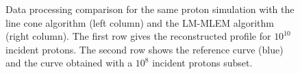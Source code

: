 \begin{figure}
  \caption{Data processing comparison for the same proton simulation with the line cone algorithm (left column) and the LM-MLEM algorithm (right column). The first row gives the reconstructed profile for $10^{10}$ incident protons. The second row shows the reference curve (blue) and the curve obtained with a $10^8$ incident protons subset.}%
\end{figure}

\begin{figure}
  \centering
  \\

\end{figure}
